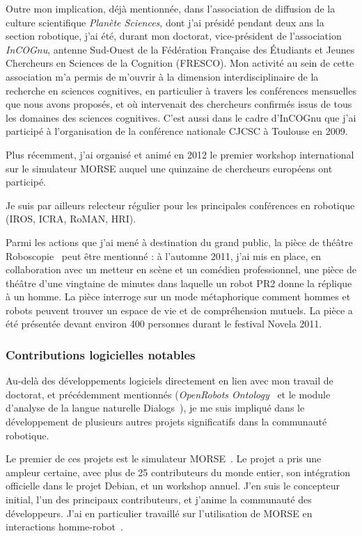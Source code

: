 \documentclass[a4paper]{article}
\begin{document}
Outre mon implication, déjà mentionnée, dans l'association de diffusion de la
culture scientifique \emph{Planète Sciences}, dont j'ai présidé pendant deux ans
la section robotique, j'ai été, durant mon doctorat, vice-président de
l'association \emph{InCOGnu}, antenne Sud-Ouest de la Fédération Française des
Étudiants et Jeunes Chercheurs en Sciences de la Cognition (FRESCO). Mon
activité au sein de cette association m'a permis de m'ouvrir à la dimension
interdisciplinaire de la recherche en sciences cognitives, en particulier à
travers les conférences mensuelles que nous avons proposés, et où intervenait
des chercheurs confirmés issus de tous les domaines des sciences cognitives.
C'est aussi dans le cadre d'InCOGnu que j'ai participé à l'organisation de la
conférence nationale CJCSC à Toulouse en 2009.

Plus récemment, j'ai organisé et animé en 2012 le premier workshop international
sur le simulateur MORSE auquel une quinzaine de chercheurs européens ont participé.

Je suis par ailleurs relecteur régulier pour les principales conférences en
robotique (IROS, ICRA, RoMAN, HRI).

Parmi les actions que j'ai mené à destination du grand public, la pièce de
théâtre Roboscopie~\cite{lemaignan2012roboscopie} peut être mentionné : à l'automne
2011, j'ai mis en place, en collaboration avec un metteur en scène et un
comédien professionnel, une pièce de théâtre d'une vingtaine de minutes dans
laquelle un robot PR2 donne la réplique à un homme. La pièce interroge sur un
mode métaphorique comment hommes et robots peuvent trouver un espace de vie et
de compréhension mutuels. La pièce a été présentée devant environ 400 personnes
durant le festival Novela 2011.

\subsubsection{Contributions logicielles notables}

Au-delà des développements logiciels directement en lien avec mon travail de
doctorat, et précédemment mentionnés (\emph{OpenRobots
Ontology}~\cite{Lemaignan2010} et le module d'analyse de la langue naturelle
{\sc Dialogs}~\cite{Lemaignan2011a}), je me suis impliqué dans le développement
de plusieurs autres projets significatifs dans la communauté robotique.

Le premier de ces projets est le simulateur MORSE~\cite{Echeverria2011,
echeverria2012simulating}. Le projet a pris une ampleur certaine, avec plus de
25 contributeurs du monde entier, son intégration officielle dans le projet
Debian, et un workshop annuel. J'en suis le concepteur initial, l'un des
principaux contributeurs, et j'anime la communauté des développeurs. J'ai en
particulier travaillé sur l'utilisation de MORSE en interactions
homme-robot~\cite{lemaignan2012morse}.
\end{document}
